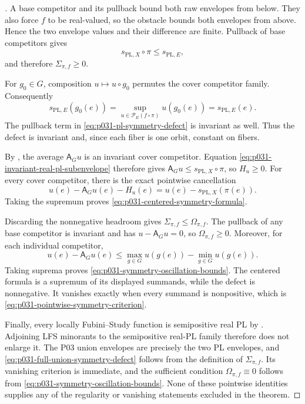 \begin{proof}[]
A base competitor and its pullback bound both raw envelopes from below.
They also force $f$ to be real-valued, so the obstacle bounds both envelopes
from above.  Hence the two envelope values and their difference are finite.
Pullback of base competitors gives
\[
                 s_{\mathrm{PL},X}\circ\pi
                     \leq s_{\mathrm{PL},E},
\]
and therefore $\Sigma_{\pi,f}\geq0$.

For $g_0\in G$, composition $u\mapsto u\circ g_0$ permutes the cover
competitor family.  Consequently
\[
 s_{\mathrm{PL},E}(g_0(e))
  =\sup_{u\in\mathcal P_E(f\circ\pi)}u(g_0(e))
  =s_{\mathrm{PL},E}(e).
\]
The pullback term in \eqref{eq:p031-pl-symmetry-defect} is invariant as
well.  Thus the defect is invariant and, since each fiber is one orbit,
constant on fibers.

By , the average
$\mathsf A_Gu$ is an invariant cover competitor.  Equation
\eqref{eq:p031-invariant-real-pl-subenvelope} therefore gives
$\mathsf A_Gu\leq s_{\mathrm{PL},X}\circ\pi$, so $H_u\geq0$.  For every
cover competitor, there is the exact pointwise cancellation
\[
 u(e)-\mathsf A_Gu(e)-H_u(e)
   =u(e)-s_{\mathrm{PL},X}(\pi(e)).
\]
Taking the supremum proves
\eqref{eq:p031-centered-symmetry-formula}.

Discarding the nonnegative headroom gives
$\Sigma_{\pi,f}\leq\Omega_{\pi,f}$.  The pullback of any base competitor is
invariant and has $u-\mathsf A_Gu=0$, so $\Omega_{\pi,f}\geq0$.  Moreover,
for each individual competitor,
\[
 u(e)-\mathsf A_Gu(e)
   \leq
      \max_{g\in G}u(g(e))-\min_{g\in G}u(g(e)).
\]
Taking suprema proves \eqref{eq:p031-symmetry-oscillation-bounds}.  The
centered formula is a supremum of its displayed summands, while the defect
is nonnegative.  It vanishes exactly when every summand is nonpositive,
which is \eqref{eq:p031-pointwise-symmetry-criterion}.

Finally, every locally Fubini--Study function is semipositive real PL by
\cite[Definition~7.8 and \S7.9]{GJR26}.  Adjoining LFS minorants to the
semipositive real-PL family therefore does not enlarge it.  The P03 union
envelopes are precisely the two PL envelopes, and
\eqref{eq:p031-full-union-symmetry-defect} follows from the definition of
$\Sigma_{\pi,f}$.  Its vanishing criterion is immediate, and the sufficient
condition $\Omega_{\pi,f}\equiv0$ follows from
\eqref{eq:p031-symmetry-oscillation-bounds}.  None of these pointwise
identities supplies any of the regularity or vanishing statements excluded
in the theorem.
\end{proof}
